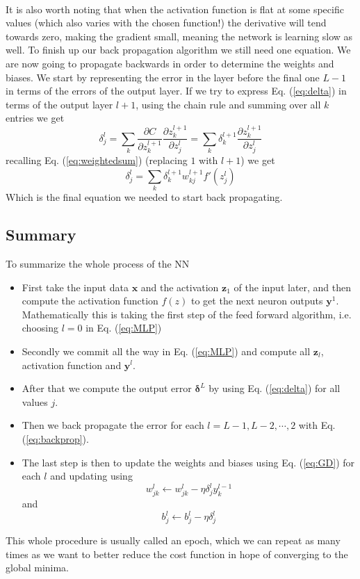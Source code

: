 \documentclass[12pt, a4paper]{book}
\begin{document}
\\It is also worth noting that when the activation function is flat at some specific values (which also varies with the chosen function!) the derivative will tend towards zero, making the gradient small, 
meaning the network is learning slow as well. To finish up our back propagation algorithm we still need one equation. We are now going to propagate backwards in order to determine the weights and biases. 
We start by representing the error in the layer before the final one $L-1$ in terms of the errors of the output layer. If we try to express Eq. (\ref{eq:delta}) in terms of the output layer $l+1$, 
using the chain rule and summing over all $k$ entries we get
$$
\delta_j^l=\sum_k\frac{\partial C}{\partial z_k^{l+1}}\frac{\partial z_k^{l+1}}{\partial z_j^l} =\sum_k \delta_k^{l+1}\frac{\partial z_k^{l+1}}{\partial z_j^l}
$$
recalling Eq. (\ref{eq:weightedsum}) (replacing $1$ with $l+1$) we get
\begin{equation}\label{eq:backprop}
    \delta_j^l=\sum_k\delta_k^{l+1}w_{kj}^{l+1}f'(z_j^l)
\end{equation}
Which is the final equation we needed to start back propagating. 

\subsection{Summary}
To summarize the whole process of the NN
\begin{itemize}
    \item First take the input data $\mathbf{x}$ and the activation $\mathbf{z}_1$ of the input later, and then compute the activation function $f(z)$ to get the next neuron outputs $\mathbf{y}^1$. 
    Mathematically this is taking the first step of the feed forward algorithm, i.e. choosing $l=0$ in Eq. (\ref{eq:MLP})
    \item Secondly we commit all the way in Eq. (\ref{eq:MLP}) and compute all $\mathbf{z}_l$, activation function and $\mathbf{y}^l$.
    \item After that we compute the output error $\bm{\delta}^L$ by using Eq. (\ref{eq:delta}) for all values $j$.
    \item Then we back propagate the error for each $l=L-1,L-2,\cdots,2$ with Eq. (\ref{eq:backprop}).
    \item The last step is then to update the weights and biases using Eq. (\ref{eq:GD}) for each $l$ and updating using
    $$
    w_{jk}^l\leftarrow w_{jk}^l-\eta\delta_j^ly_k^{l-1}
    $$
    and
    $$
    b_j^l \leftarrow b_j^l-\eta\delta_j^l
    $$
\end{itemize}
This whole procedure is usually called an epoch, which we can repeat as many times as we want to better reduce the cost function in hope of converging to the global minima.
\end{document}
